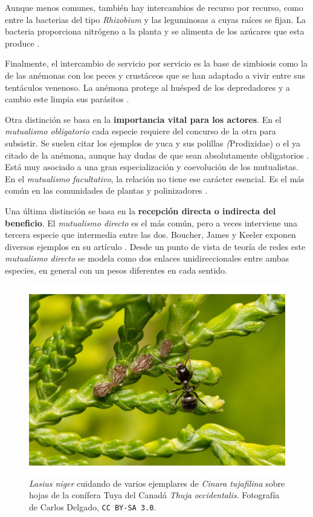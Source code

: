 Aunque menos comunes, también hay intercambios de recurso por recurso, como entre la bacterias del tipo \textit{Rhizobium} y las leguminosas a cuyas raíces se fijan. La bacteria proporciona nitrógeno a la planta y se alimenta de los azúcares que esta produce \cite{lindstrom2010biodiversity}.
	
Finalmente, el intercambio de servicio por servicio es la base de simbiosis como la de las anémonas con los peces y crustáceos que se han adaptado a vivir entre sus tentáculos venenoso. La anémona protege al huésped de los depredadores y a cambio este limpia sus parásitos \cite{mebs2009chemical}.

Otra distinción se basa en la \textbf{importancia vital para los actores}. En el \textit{mutualismo obligatorio} cada especie requiere del concurso de la otra para subsistir. Se suelen citar los ejemplos de yuca y sus polillas \textit(Prodixidae) o el ya citado de la anémona, aunque hay dudas de que sean absolutamente obligatorios \cite{briand1982phylogenetic, addicott1995cheating}. Está muy asociado a una gran especialización y coevolución de los mutualistas. En el \textit{mutualismo facultativo}, la relación no tiene ese carácter esencial. Es el más común en las comunidades de plantas y polinizadores \cite{geib2012tracing}.

Una última distinción se basa en la \textbf{recepción directa o indirecta del beneficio}. El \textit{mutualismo directo} es el más común, pero a veces interviene una tercera especie que
intermedia entre las dos. Boucher, James y Keeler exponen diversos ejemplos en su artículo \cite{boucher1982ecology}. Desde un punto de vista de teoría de redes este \textit{mutualismo directo} se modela como dos enlaces unidireccionales entre ambas especies, en general con un pesos diferentes en cada sentido.


\begin{figure}[h!]
\centering
\includegraphics[scale=1]{Figures/INTRO_Lasius_niger_y_Cinara_tujafilina_en_Thuja_occidentalis.jpg}
\caption{\textit{Lasius niger} cuidando de varios ejemplares de \textit{Cinara tujafilina} sobre hojas de la conífera Tuya del Canadá \textit{Thuja occidentalis}. Fotografía de Carlos Delgado, \small{\texttt{CC BY-SA 3.0}}.}
\label{fig:INTRO_Lasius_niger_y_Cinara_tujafilina_en_Thuja_occidentalis}
\end{figure}

